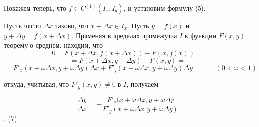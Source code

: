 \documentclass[a4paper, 12pt]{book}
\begin{document}
    \par Покажем теперь, что $f \in C^{(1)}(I_x; I_y)$, и установим формулу (5).
    \par Пусть число $\Delta x$ таково, что $x + \Delta x \in I_x$. Пусть $y = f(x)$ и $y + \Delta y = f(x + \Delta x)$. Применяя в пределах промежутка $I$ к функции $F(x, y)$ теорему о среднем, находим, что
    $$0 = F(x + \Delta x, f(x + \Delta x)) - F(x, f(x)) = $$
    $$= F(x + \Delta x, y + \Delta y) - F(x, y) = $$
    $$= F'_x(x + \omega \Delta x, y  + \omega \Delta y) \Delta x  + F'_y(x + \omega \Delta x, y + \omega \Delta y) \Delta y  \;\;\;\;\;\;\;\;\;\;\;\; (0 < \omega < 1) $$
    \par откуда, учитывая, что $F′_y(x, y) \neq 0$ в $I$, получаем
    
    \begin{flushright} 
    $$\frac{\Delta y}{\Delta x} = - \frac{F'_x(x + \omega \Delta x, y  + \omega \Delta y}{F'_y(x + \omega \Delta x, y + \omega \Delta y)}$$. \quad \quad \quad \quad \quad \quad \quad \quad \quad 
    \textrm{(7)}
    \end{flushright}
    
\end{document}
